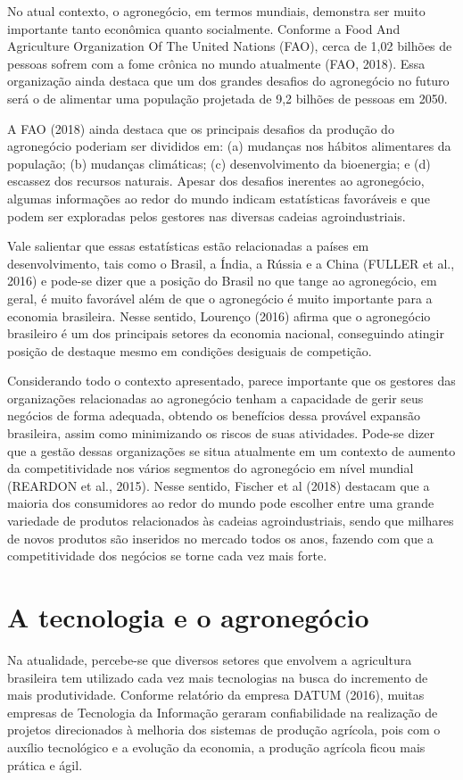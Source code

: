 \documentclass[eso]{bcc}
\begin{document}
No atual contexto, o agronegócio, em termos mundiais, demonstra ser muito importante tanto 
econômica quanto socialmente. Conforme a Food And Agriculture Organization Of The United Nations (FAO), 
cerca de 1,02 bilhões de pessoas sofrem com a fome crônica no mundo atualmente (FAO, 2018). 
Essa organização ainda destaca que um dos grandes desafios do agronegócio no futuro será o de 
alimentar uma população projetada de 9,2 bilhões de pessoas em 2050.

A FAO (2018) ainda destaca que os principais desafios da produção do agronegócio poderiam ser 
divididos em: (a) mudanças nos hábitos alimentares da população; (b) mudanças climáticas; 
(c) desenvolvimento da bioenergia; e (d) escassez dos recursos naturais. Apesar dos desafios 
inerentes ao agronegócio, algumas informações ao redor do mundo indicam estatísticas favoráveis 
e que podem ser exploradas pelos gestores nas diversas cadeias agroindustriais.

Vale salientar que essas estatísticas estão relacionadas a países em desenvolvimento, 
tais como o Brasil, a Índia, a Rússia e a China (FULLER et al., 2016) e pode-se dizer que a 
posição do Brasil no que tange ao agronegócio, em geral, é muito favorável além de que o 
agronegócio é muito importante para a economia brasileira. Nesse sentido, Lourenço (2016) 
afirma que o agronegócio brasileiro é um dos principais setores da economia nacional, conseguindo 
atingir posição  de  destaque  mesmo  em  condições  desiguais  de  competição.

Considerando  todo  o  contexto  apresentado,  parece  importante  que  os  gestores  das 
organizações  relacionadas  ao  agronegócio  tenham  a  capacidade  de  gerir seus negócios 
de forma adequada, obtendo os benefícios dessa provável expansão brasileira, assim como 
minimizando os riscos de suas atividades. Pode-se dizer que a gestão dessas organizações 
se situa atualmente em um contexto de aumento da competitividade nos vários segmentos do 
agronegócio em nível mundial (REARDON et al., 2015). Nesse sentido, Fischer et al (2018) destacam 
que  a  maioria  dos  consumidores  ao  redor  do  mundo  pode  escolher  entre uma grande 
variedade de produtos relacionados às cadeias agroindustriais, sendo que milhares de novos 
produtos são inseridos no mercado todos os anos, fazendo com que a competitividade dos negócios 
se torne cada vez mais forte.

\section{A tecnologia e o agronegócio}
Na atualidade, percebe-se  que diversos setores que envolvem a agricultura brasileira tem utilizado 
cada vez mais tecnologias na busca do incremento de mais produtividade. Conforme relatório da 
empresa DATUM (2016), muitas empresas de Tecnologia da Informação geraram confiabilidade na realização 
de projetos direcionados à melhoria dos sistemas de produção agrícola, pois com o auxílio tecnológico 
e a evolução da economia, a produção agrícola ficou mais prática e ágil.
\end{document}
